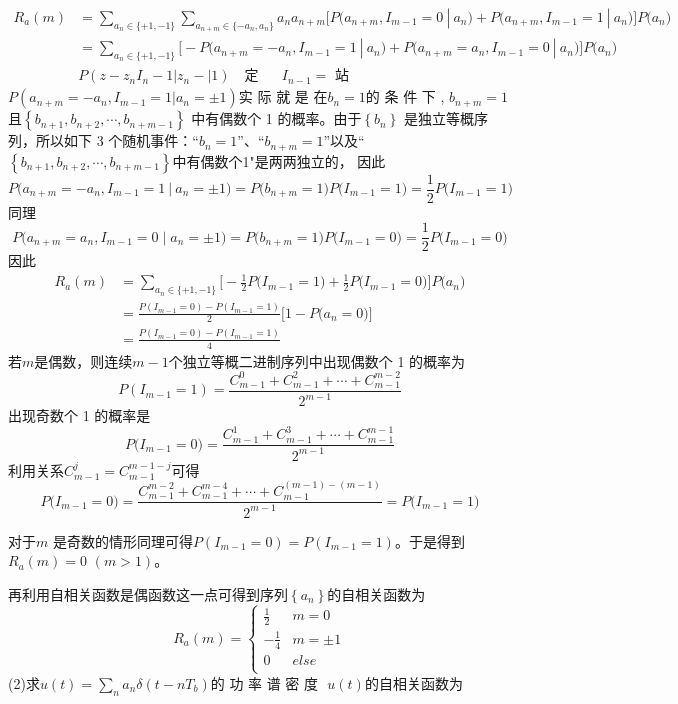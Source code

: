 \documentclass[utf8]{article}
\begin{document}
$$\begin{aligned}R_{a}\left(m\right)&=\sum_{a_{n}\in\{+1,-1\}}\sum_{a_{n+m}\in\{-a_{n},a_{n}\}}a_{n}a_{n+m}\Big[P\big(a_{n+m},I_{m-1}=0\:|\:a_{n}\big)+P\big(a_{n+m},I_{m-1}=1\:|\:a_{n}\big)\Big]P\big(a_{n}\big)\\&=\sum_{a_{n}\in\{+1,-1\}}\Big[-P\big(a_{n+m}=-a_{n},I_{m-1}=1\:|\:a_{n}\big)+P\big(a_{n+m}=a_{n},I_{m-1}=0\:|\:a_{n}\big)\Big]P\big(a_{n}\big)\\&P(z-z_{n}I_{n}-1|z_{n}-|1)\quad\text{定}\quad\text{ }I_{n-1}=\text{ 站 }\end{aligned}$$
$P(a_{n+m}=-a_n,I_{m-1}=1|a_n=\pm1)$实 际 就 是 在$b_n=1$的 条 件 下 , $b_{n+m}=1$且$\left\{b_{n+1},b_{n+2},\cdots,b_{n+m-1}\right\}$ 中有偶数个 1 的概率。由于$\left\{b_n\right\}$ 是独立等概序列，所以如下 3 个随机事件：“$b_n=1$”、“$b_{n+m}=1$”以及“$\left\{b_{n+1},b_{n+2},\cdots,b_{n+m-1}\right\}$中有偶数个1"是两两独立的， 因此
$$P\big(a_{n+m}=-a_n,I_{m-1}=1\:|\:a_n=\pm1\big)=P\big(b_{n+m}=1\big)P\big(I_{m-1}=1\big)=\frac{1}{2}P\big(I_{m-1}=1\big)$$
同理
$$P\big(a_{n+m}=a_n,I_{m-1}=0\mid a_n=\pm1\big)=P\big(b_{n+m}=1\big)P\big(I_{m-1}=0\big)=\frac{1}{2}P\big(I_{m-1}=0\big)$$
因此
$$\begin{aligned}R_{a}\left(m\right)&=\sum_{a_{n}\in\{+1,-1\}}\biggl[-\frac{1}{2}P\bigl(I_{m-1}=1\bigr)+\frac{1}{2}P\bigl(I_{m-1}=0\bigr)\biggr]P\bigl(a_{n}\bigr)\\&=\frac{P\left(I_{m-1}=0\right)-P\left(I_{m-1}=1\right)}{2}\biggl[1-P\bigl(a_{n}=0\bigr)\biggr]\\&=\frac{P\left(I_{m-1}=0\right)-P\left(I_{m-1}=1\right)}{4}\end{aligned}$$
若$m$是偶数，则连续$m-1$个独立等概二进制序列中出现偶数个 1 的概率为
$$P\left(I_{m-1}=1\right)=\frac{C_{m-1}^{0}+C_{m-1}^{2}+\cdots+C_{m-1}^{m-2}}{2^{m-1}}$$
出现奇数个 1 的概率是
$$P\big(I_{m-1}=0\big)=\frac{C_{m-1}^1+C_{m-1}^3+\cdots+C_{m-1}^{m-1}}{2^{m-1}}$$
利用关系$C_{m-1}^j=C_{m-1}^{m-1-j}$可得
$$P\big(I_{m-1}=0\big)=\frac{C_{m-1}^{m-2}+C_{m-1}^{m-4}+\cdots+C_{m-1}^{(m-1)-(m-1)}}{2^{m-1}}=P\big(I_{m-1}=1\big)$$

对于$m$ 是奇数的情形同理可得$P(I_{m-1}=0)=P(I_{m-1}=1)$。于是得到$R_a( m) = 0$ $( m> 1) $。

再利用自相关函数是偶函数这一点可得到序列$\left\{a_n\right\}$的自相关函数为
$$R_a\left(m\right)=\begin{cases}\frac{1}{2}&m=0\\-\frac{1}{4}&m=\pm1\\0&else\\\end{cases}$$
(2)求$u\left ( t\right ) = \sum _{n}a_{n}\delta \left ( t- nT_{b}\right ) \textbf{的 功 率 谱 密 度 }$ $u(t)$的自相关函数为
\end{document}
